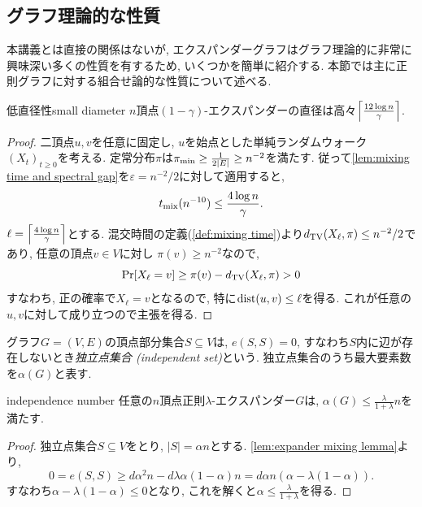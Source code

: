\subsection{グラフ理論的な性質}
本講義とは直接の関係はないが,
エクスパンダーグラフはグラフ理論的に非常に興味深い多くの性質を有するため,
いくつかを簡単に紹介する.
本節では主に正則グラフに対する組合せ論的な性質について述べる.

\begin{proposition}{低直径性}{small diameter}
    $n$頂点$(1-\gamma)$-エクスパンダーの直径は高々$\ceil*{\frac{12\log n}{\gamma}}$.
\end{proposition}
\begin{proof}
    二頂点$u,v$を任意に固定し,
    $u$を始点とした単純ランダムウォーク$(X_t)_{t\ge 0}$を考える.
    定常分布$\pi$は$\pimin \ge \frac{1}{2|E|} \ge n^{-2}$を満たす.
    従って\cref{lem:mixing time and spectral gap}を$\varepsilon=n^{-2}/2$に対して適用すると,
    \[
        \tmix(n^{-10}) \le \frac{4\log n}{\gamma}.
    \]
    $\ell=\ceil*{\frac{4\log n}{\gamma}}$とする.
    混交時間の定義(\cref{def:mixing time})より$\dtv(X_{\ell}, \pi) \le n^{-2}/2$であり, 任意の頂点$v\in V$に対し
    $\pi(v) \ge n^{-2}$なので,
    \[
        \Pr[X_\ell = v] \ge \pi(v) - \dtv(X_\ell,\pi) >0
    \]
    すなわち, 正の確率で$X_\ell = v$となるので, 特に$\dist(u,v) \le \ell$を得る.
    これが任意の$u,v$に対して成り立つので主張を得る.
\end{proof}

グラフ$G = (V,E)$の頂点部分集合$S\subseteq V$は, $e(S,S)=0$, すなわち$S$内に辺が存在しないとき\emph{独立点集合 (independent set)}という.
独立点集合のうち最大要素数を$\alpha(G)$と表す.
\begin{proposition}{}{independence number}
    任意の$n$頂点正則$\lambda$-エクスパンダー$G$は, $\alpha(G) \le \frac{\lambda}{1+\lambda}n$を満たす.
\end{proposition}
\begin{proof}
    独立点集合$S\subseteq V$をとり, $|S|= \alpha n$とする.
    \cref{lem:expander mixing lemma}より,
    \[
        0 = e(S,S) \ge  d \alpha^2 n - d\lambda \alpha(1-\alpha) n = d\alpha n (\alpha - \lambda(1-\alpha)).
    \]
    すなわち$\alpha - \lambda(1-\alpha) \le 0$となり, これを解くと$\alpha\le \frac{\lambda}{1+\lambda}$を得る.
\end{proof}


